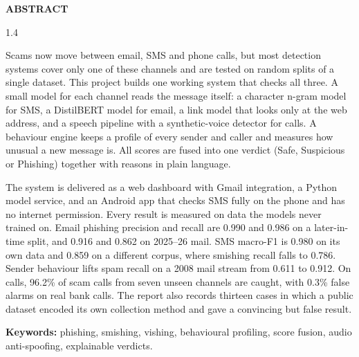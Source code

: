 \begin{center}\vspace{1.0in}
\bfseries\LARGE{ABSTRACT} \\
\end{center}\vspace{0.2in}

\normalsize{\begin{spacing}{1.4}
\noindent

Scams now move between email, SMS and phone calls, but most detection systems cover only one of these channels and are tested on random splits of a single dataset. This project builds one working system that checks all three. A small model for each channel reads the message itself: a character n-gram model for SMS, a DistilBERT model for email, a link model that looks only at the web address, and a speech pipeline with a synthetic-voice detector for calls. A behaviour engine keeps a profile of every sender and caller and measures how unusual a new message is. All scores are fused into one verdict (Safe, Suspicious or Phishing) together with reasons in plain language.

The system is delivered as a web dashboard with Gmail integration, a Python model service, and an Android app that checks SMS fully on the phone and has no internet permission. Every result is measured on data the models never trained on. Email phishing precision and recall are 0.990 and 0.986 on a later-in-time split, and 0.916 and 0.862 on 2025--26 mail. SMS macro-F1 is 0.980 on its own data and 0.859 on a different corpus, where smishing recall falls to 0.786. Sender behaviour lifts spam recall on a 2008 mail stream from 0.611 to 0.912. On calls, 96.2\% of scam calls from seven unseen channels are caught, with 0.3\% false alarms on real bank calls. The report also records thirteen cases in which a public dataset encoded its own collection method and gave a convincing but false result.

\vspace{0.3cm}
\noindent\textbf{Keywords:} phishing, smishing, vishing, behavioural profiling, score fusion, audio anti-spoofing, explainable verdicts.

\end{spacing}}

